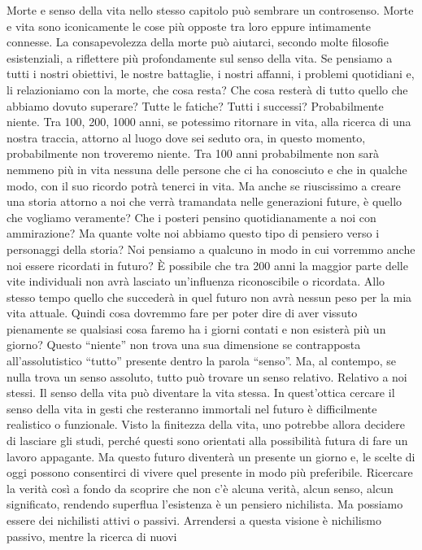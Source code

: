 \documentclass[12pt]{book} %
\begin{document}
Morte e senso della vita nello stesso capitolo può sembrare un controsenso. Morte e vita sono iconicamente le cose più
opposte tra loro eppure intimamente connesse. La consapevolezza della morte può aiutarci, secondo molte filosofie esistenziali, a riflettere più profondamente sul senso della vita. Se pensiamo
a tutti i nostri obiettivi, le nostre battaglie, i nostri affanni, i problemi quotidiani e, li relazioniamo con la
morte, che cosa resta? Che cosa resterà di tutto quello che abbiamo dovuto superare? Tutte le fatiche? Tutti i
successi? Probabilmente niente. Tra 100, 200, 1000 anni, se potessimo ritornare in vita, alla ricerca di una nostra traccia, attorno
al luogo dove sei seduto ora, in questo momento, probabilmente non troveremo niente.
Tra 100 anni probabilmente non sarà nemmeno più in vita nessuna delle persone che ci ha
conosciuto e che in qualche modo, con il suo ricordo potrà tenerci in vita. Ma anche se riuscissimo a creare una storia
attorno a noi che verrà tramandata nelle generazioni future, è quello che vogliamo veramente? Che i posteri pensino
quotidianamente a noi con ammirazione? Ma quante volte noi abbiamo questo tipo di pensiero verso i personaggi della
storia? Noi pensiamo a qualcuno in modo in cui vorremmo anche noi essere ricordati in futuro? È possibile che tra 200 anni la maggior parte delle vite individuali non avrà lasciato un’influenza riconoscibile o ricordata. Allo stesso tempo quello che succederà in quel futuro non avrà nessun peso
per la mia vita attuale. Quindi cosa dovremmo fare per poter dire di aver vissuto pienamente se qualsiasi cosa faremo
ha i giorni contati e non esisterà più un giorno? Questo “niente” non trova una sua dimensione se contrapposta
all'assolutistico “tutto” presente dentro la parola “senso”. Ma, al contempo, se nulla trova un
senso assoluto, tutto può trovare un senso relativo. Relativo a noi stessi. Il senso della vita può diventare la vita stessa. 
In quest'ottica cercare il senso della vita in gesti che resteranno immortali nel futuro è difficilmente realistico o funzionale. 
Visto la finitezza della vita, uno potrebbe allora decidere
di lasciare gli studi, perché questi sono orientati alla possibilità futura di fare un lavoro appagante. Ma questo
futuro diventerà un presente un giorno e, le scelte di oggi possono consentirci di vivere quel presente in modo più
preferibile. Ricercare la verità così a fondo da scoprire che non c'è alcuna verità, alcun senso, alcun
significato, rendendo superflua l'esistenza è un pensiero nichilista. Ma possiamo essere dei
nichilisti attivi o passivi. Arrendersi a questa visione è nichilismo passivo, mentre la ricerca di nuovi
\end{document}
